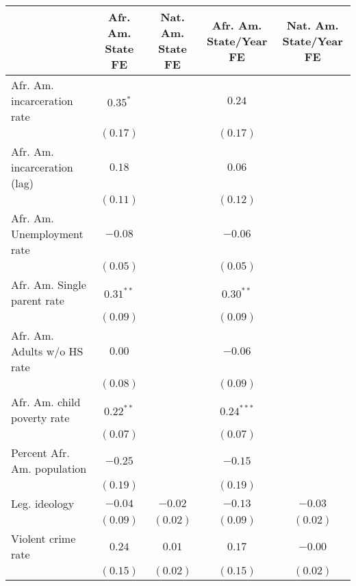 
\begin{table}
\begin{center}
\begin{tabular}{l c c c c }
\hline
 & Afr. Am. State FE & Nat. Am. State FE & Afr. Am. State/Year FE & Nat. Am. State/Year FE \\
\hline
Afr. Am. incarceration rate  & $0.35^{*}$  &               & $0.24$       &              \\
                             & $(0.17)$    &               & $(0.17)$     &              \\
Afr. Am. incarceration (lag) & $0.18$      &               & $0.06$       &              \\
                             & $(0.11)$    &               & $(0.12)$     &              \\
Afr. Am. Unemployment rate   & $-0.08$     &               & $-0.06$      &              \\
                             & $(0.05)$    &               & $(0.05)$     &              \\
Afr. Am. Single parent rate  & $0.31^{**}$ &               & $0.30^{**}$  &              \\
                             & $(0.09)$    &               & $(0.09)$     &              \\
Afr. Am. Adults w/o HS rate  & $0.00$      &               & $-0.06$      &              \\
                             & $(0.08)$    &               & $(0.09)$     &              \\
Afr. Am. child poverty rate  & $0.22^{**}$ &               & $0.24^{***}$ &              \\
                             & $(0.07)$    &               & $(0.07)$     &              \\
Percent Afr. Am. population  & $-0.25$     &               & $-0.15$      &              \\
                             & $(0.19)$    &               & $(0.19)$     &              \\
Leg. ideology                & $-0.04$     & $-0.02$       & $-0.13$      & $-0.03$      \\
                             & $(0.09)$    & $(0.02)$      & $(0.09)$     & $(0.02)$     \\
Violent crime rate           & $0.24$      & $0.01$        & $0.17$       & $-0.00$      \\
                             & $(0.15)$    & $(0.02)$      & $(0.15)$     & $(0.02)$     \\

\end{tabular}
\end{center}
\end{table}
